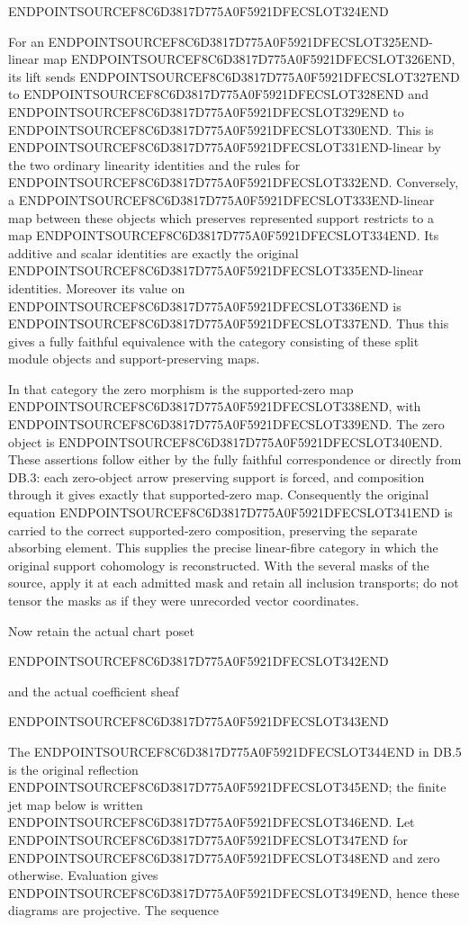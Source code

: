 ENDPOINTSOURCEF8C6D3817D775A0F5921DFECSLOT324END

For an ENDPOINTSOURCEF8C6D3817D775A0F5921DFECSLOT325END-linear map ENDPOINTSOURCEF8C6D3817D775A0F5921DFECSLOT326END, its lift sends ENDPOINTSOURCEF8C6D3817D775A0F5921DFECSLOT327END to ENDPOINTSOURCEF8C6D3817D775A0F5921DFECSLOT328END and ENDPOINTSOURCEF8C6D3817D775A0F5921DFECSLOT329END to ENDPOINTSOURCEF8C6D3817D775A0F5921DFECSLOT330END. This is ENDPOINTSOURCEF8C6D3817D775A0F5921DFECSLOT331END-linear by the two ordinary linearity identities and the rules for ENDPOINTSOURCEF8C6D3817D775A0F5921DFECSLOT332END. Conversely, a ENDPOINTSOURCEF8C6D3817D775A0F5921DFECSLOT333END-linear map between these objects which preserves represented support restricts to a map ENDPOINTSOURCEF8C6D3817D775A0F5921DFECSLOT334END. Its additive and scalar identities are exactly the original ENDPOINTSOURCEF8C6D3817D775A0F5921DFECSLOT335END-linear identities. Moreover its value on ENDPOINTSOURCEF8C6D3817D775A0F5921DFECSLOT336END is ENDPOINTSOURCEF8C6D3817D775A0F5921DFECSLOT337END. Thus this gives a fully faithful equivalence with the category consisting of these split module objects and support-preserving maps.

In that category the zero morphism is the supported-zero map ENDPOINTSOURCEF8C6D3817D775A0F5921DFECSLOT338END, with ENDPOINTSOURCEF8C6D3817D775A0F5921DFECSLOT339END. The zero object is ENDPOINTSOURCEF8C6D3817D775A0F5921DFECSLOT340END. These assertions follow either by the fully faithful correspondence or directly from DB.3: each zero-object arrow preserving support is forced, and composition through it gives exactly that supported-zero map. Consequently the original equation ENDPOINTSOURCEF8C6D3817D775A0F5921DFECSLOT341END is carried to the correct supported-zero composition, preserving the separate absorbing element. This supplies the precise linear-fibre category in which the original support cohomology is reconstructed. With the several masks of the source, apply it at each admitted mask and retain all inclusion transports; do not tensor the masks as if they were unrecorded vector coordinates.

Now retain the actual chart poset

ENDPOINTSOURCEF8C6D3817D775A0F5921DFECSLOT342END

and the actual coefficient sheaf

ENDPOINTSOURCEF8C6D3817D775A0F5921DFECSLOT343END

The ENDPOINTSOURCEF8C6D3817D775A0F5921DFECSLOT344END in DB.5 is the original reflection ENDPOINTSOURCEF8C6D3817D775A0F5921DFECSLOT345END; the finite jet map below is written ENDPOINTSOURCEF8C6D3817D775A0F5921DFECSLOT346END. Let ENDPOINTSOURCEF8C6D3817D775A0F5921DFECSLOT347END for ENDPOINTSOURCEF8C6D3817D775A0F5921DFECSLOT348END and zero otherwise. Evaluation gives ENDPOINTSOURCEF8C6D3817D775A0F5921DFECSLOT349END, hence these diagrams are projective. The sequence

